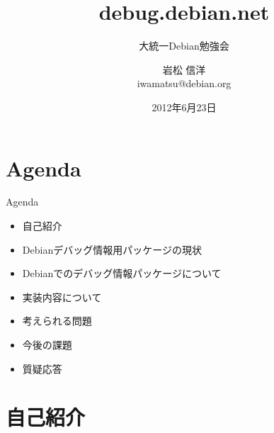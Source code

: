 
\title{debug.debian.net}
\subtitle{大統一Debian勉強会}
\author{岩松 信洋\\iwamatsu@debian.org}
\date{2012年6月23日}



\frame{\titlepage{}}

\section{Agenda}
\begin{frame}{Agenda}
  \begin{itemize}
  \item 自己紹介
  \item Debianデバッグ情報用パッケージの現状
  \item Debianでのデバッグ情報パッケージについて
  \item 実装内容について
  \item 考えられる問題
  \item 今後の課題
  \item 質疑応答
\end{itemize}
\end{frame}

\section{自己紹介}


